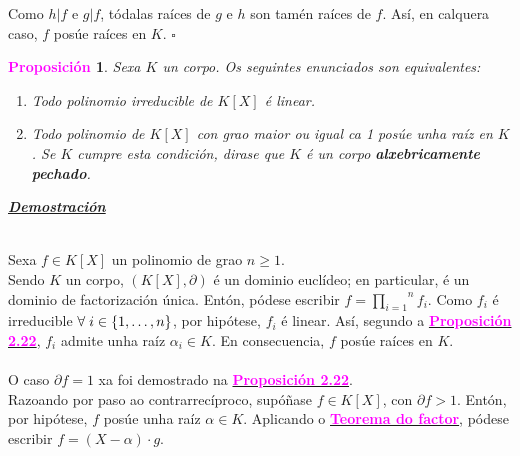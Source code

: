 \documentclass[twoside]{report}
\newcommand{\magbf}[1]{\textcolor{magenta}{\textbf{#1}}} %
\theoremstyle{mystyle}
\newtheorem{prop}{\magbf{Proposición}}[chapter]
\newenvironment{proposition}
{\begin{mdframed}[linecolor = magenta,backgroundcolor = classicrose, linewidth = 2mm]\begin{prop}}
{\end{prop}\end{mdframed}}
\begin{document}
\noindent Como $h|f$ e $g|f$, tódalas raíces de $g$ e $h$ son tamén raíces de $f$. Así, en calquera caso, $f$ posúe raíces en $K$. $\square$ \\

\vspace{2mm}

\begin{proposition} \label{prop2.23}
Sexa $K$ un corpo. Os seguintes enunciados son equivalentes:
\begin{enumerate}
    \item Todo polinomio irreducible de $K[X]$ é linear.
    \item Todo polinomio de $K[X]$ con grao maior ou igual ca 1 posúe unha raíz en $K$. Se $K$ cumpre esta condición, dirase que $K$ é un corpo \textbf{alxebricamente pechado}.
\end{enumerate}
\end{proposition}

\vspace{2mm}

\noindent \textbf{\textit{\underline{Demostración}}}

\vspace{2mm}

\noindent {}\\

\noindent Sexa $f \in K[X]$ un polinomio de grao $n \geq 1$.\\

\noindent Sendo $K$ un corpo, $(K[X], \partial)$ é un dominio euclídeo; en particular, é un dominio de factorización única. Entón, pódese escribir $f = \overset{n}{\underset{i = 1}{\prod}}f_{i}$. Como $f_{i}$ é irreducible $\forall \hspace{1mm} i \in \{1, \ldots, n\}$, por hipótese, $f_{i}$ é linear. Así, segundo a \hyperref[prop2.22]{\magbf{Proposición 2.22}}, $f_{i}$ admite unha raíz $\alpha_{i} \in K$. En consecuencia, $f$ posúe raíces en $K$.\\

\noindent {}\\

\noindent O caso $\partial f = 1$ xa foi demostrado na \hyperref[prop2.22]{\magbf{Proposición 2.22}}.\\

\noindent Razoando por paso ao contrarrecíproco, supóñase $f \in K[X]$, con $\partial f > 1$. Entón, por hipótese, $f$ posúe unha raíz $\alpha \in K$. Aplicando o \hyperref[cor2.6]{\magbf{Teorema do factor}}, pódese escribir $f = (X - \alpha) \cdot g$.\\ 
\end{document}
